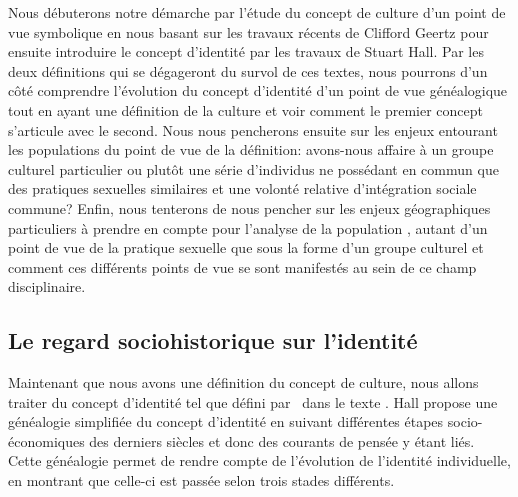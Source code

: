 Nous débuterons notre démarche par l'étude du concept de culture d'un point de vue symbolique en nous basant sur les travaux récents de Clifford Geertz pour ensuite introduire le concept d'identité par les travaux de Stuart Hall. 
Par les deux définitions qui se dégageront du survol de ces textes, nous pourrons d'un côté comprendre l'évolution du concept d'identité d'un point de vue généalogique tout en ayant une définition de la culture et voir comment le premier concept s'articule avec le second. 
Nous nous pencherons ensuite sur les enjeux entourant les populations \lgbt{} du point de vue de la définition: avons-nous affaire à un groupe culturel particulier ou plutôt une série d'individus ne possédant en commun que des pratiques sexuelles similaires et une volonté relative d'intégration sociale commune? 
Enfin, nous tenterons de nous pencher sur les enjeux géographiques particuliers à prendre en compte pour l'analyse de la population \lgbt{}, autant d'un point de vue de la pratique sexuelle que sous la forme d'un groupe culturel et comment ces différents points de vue se sont manifestés au sein de ce champ disciplinaire.


\subsection{Le regard sociohistorique sur l'identité}
\label{sec:le_regard_sociohistoirique_sur_l_identit_} Maintenant que nous avons une définition du concept de culture, nous allons traiter du concept d'identité tel que défini par~\citet{Hall1996a} dans le texte . 
Hall propose une généalogie simplifiée du concept d'identité en suivant différentes étapes socio-économiques des derniers siècles et donc des courants de pensée y étant liés. 
Cette généalogie permet de rendre compte de l'évolution de l'identité individuelle, en montrant que celle-ci est passée selon trois stades différents.

